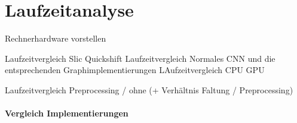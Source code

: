 \section{Laufzeitanalyse}
\label{laufzeitanalyse}

Rechnerhardware vorstellen

Laufzeitvergleich Slic Quickshift
Laufzeitvergleich Normales CNN und die entsprechenden Graphimplementierungen
LAufzeitvergleich CPU GPU

Laufzeitvergleich Preprocessing / ohne (+ Verhältnis Faltung / Preprocessing)


\paragraph{Vergleich \bzgl{} Implementierungen}
\label{vergleich_laufzeit}


